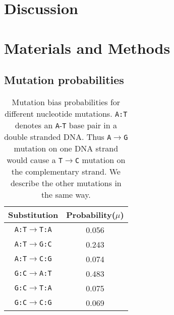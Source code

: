\documentclass[12pt,a4paper]{article}
\begin{document}
\section*{Discussion} 


\section*{Materials and Methods}

\subsection{Mutation probabilities}

\begin{table}[H]
\centering
\begin{tabular}{c c}
\toprule
\textbf{Substitution} & Probability($\mu$) \\\midrule
\texttt{A:T}$\to$\texttt{T:A} & 0.056 \\\midrule
\texttt{A:T}$\to$\texttt{G:C} & 0.243 \\\midrule
\texttt{A:T}$\to$\texttt{C:G} & 0.074 \\\midrule
\texttt{G:C}$\to$\texttt{A:T} & 0.483 \\\midrule
\texttt{G:C}$\to$\texttt{T:A} & 0.075 \\\midrule
\texttt{G:C}$\to$\texttt{C:G} & 0.069 \\\bottomrule
\end{tabular}
\caption{Mutation bias probabilities for different nucleotide mutations. \texttt{A:T} denotes an \texttt{A}-\texttt{T} base pair in a double stranded DNA. Thus \texttt{A}$\to$\texttt{G} mutation on one DNA strand would cause a \texttt{T}$\to$\texttt{C} mutation on the complementary strand. We describe the other mutations in the same way.}
\label{mutbias}
\end{table}
\end{document}
